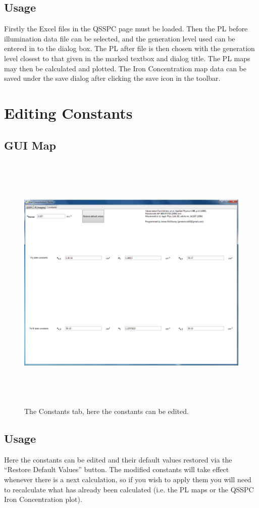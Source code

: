 \documentclass[final,a4paper,oneside,12pt]{article}
\begin{document}
\subsection{Usage}
Firstly the Excel files in the QSSPC page must be loaded. Then the PL before illumination data file can be selected, and the generation level used can be entered in to the dialog box. The PL after file is then chosen with the generation level closest to that given in the marked textbox and dialog title. The PL maps may then be calculated and plotted. The Iron Concentration map data can be saved under the save dialog after clicking the save icon in the toolbar.
\pagebreak
\section{Editing Constants}
\subsection{GUI Map}
\begin{figure}[h!]
\includegraphics[height=5in]{constants}
\caption{\label{figure3} The Constants tab, here the constants can be edited.}
\end{figure}

\subsection{Usage}
Here the constants can be edited and their default values restored via the ``Restore Default Values'' button. The modified constants will take effect whenever there is a next calculation, so if you wish to apply them you will need to recalculate what has already been calculated (i.e. the PL maps or the QSSPC Iron Concentration plot).
\end{document}
